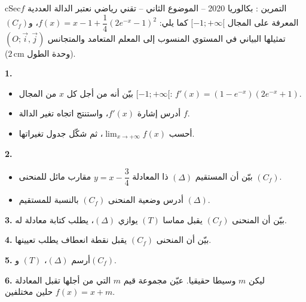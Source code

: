 \documentclass[12pt,a4paper]{article}
\newenvironment{BOX}[2]{\begin{otherlanguage}{english}\begin{arbox}{#1}{#2}}{\end{arbox}\end{otherlanguage}}
\newcounter{exo}
\newenvironment{tamrin}[1]{\stepcounter{exo}\begin{BOX}{cSec}{التمرين \theexo: #1}}{\end{BOX}}
\newenvironment{sq}{\begin{itemize}[leftmargin=2.4em,itemsep=3pt]}{\end{itemize}}
\newcommand{\qa}{\item[(أ)]}\newcommand{\qb}{\item[(ب)]}\newcommand{\qc}{\item[(جـ)]}\newcommand{\qd}{\item[(د)]}\newcommand{\qe}{\item[(هـ)]}
\newcommand{\QQ}[1]{\par\smallskip\textbf{#1.} }
\begin{document}
\begin{tamrin}{بكالوريا 2020 -- الموضوع الثاني -- تقني رياضي}
نعتبر الدالة العددية $f$ المعرفة على المجال $[-1;+\infty[$ كما يلي: $f(x)=x-1+\dfrac14\left(2e^{-x}-1\right)^2$، و$(C_f)$ تمثيلها البياني في المستوي المنسوب إلى المعلم المتعامد والمتجانس $(O;\vec{i},\vec{j})$ (وحدة الطول $2\,\text{cm}$).
\QQ{1}
\begin{sq}
\qa بيّن أنه من أجل كل $x$ من المجال $[-1;+\infty[$: $f'(x)=\left(1-e^{-x}\right)\left(2e^{-x}+1\right)$.
\qb أدرس إشارة $f'(x)$، واستنتج اتجاه تغير الدالة $f$.
\qc أحسب $\displaystyle\lim_{x\to+\infty}f(x)$، ثم شكّل جدول تغيراتها.
\end{sq}
\QQ{2}
\begin{sq}
\qa بيّن أن المستقيم $(\Delta)$ ذا المعادلة $y=x-\dfrac34$ مقارب مائل للمنحنى $(C_f)$.
\qb أدرس وضعية المنحنى $(C_f)$ بالنسبة للمستقيم $(\Delta)$.
\end{sq}
\QQ{3} بيّن أن المنحنى $(C_f)$ يقبل مماسا $(T)$ يوازي $(\Delta)$، يطلب كتابة معادلة له.
\QQ{4} بيّن أن المنحنى $(C_f)$ يقبل نقطة انعطاف يطلب تعيينها.
\QQ{5} أرسم $(\Delta)$، $(T)$ و$(C_f)$.
\QQ{6} ليكن $m$ وسيطا حقيقيا. عيّن مجموعة قيم $m$ التي من أجلها تقبل المعادلة $f(x)=x+m$ حلين مختلفين.
\end{tamrin}
\end{document}
